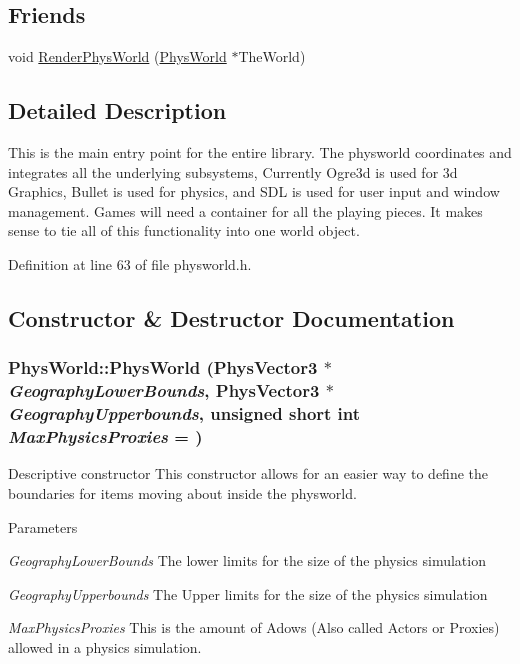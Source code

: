 \subsection*{Friends}
\begin{DoxyCompactItemize}
\item 
void \hyperlink{classPhysWorld_a54ca2a75bbccb9b2129f434874f1e693}{RenderPhysWorld} (\hyperlink{classPhysWorld}{PhysWorld} $\ast$TheWorld)
\end{DoxyCompactItemize}


\subsection{Detailed Description}
This is the main entry point for the entire library. The physworld coordinates and integrates all the underlying subsystems, Currently Ogre3d is used for 3d Graphics, Bullet is used for physics, and SDL is used for user input and window management. Games will need a container for all the playing pieces. It makes sense to tie all of this functionality into one world object. 

Definition at line 63 of file physworld.h.

\subsection{Constructor \& Destructor Documentation}
\hypertarget{classPhysWorld_a3228c98369082139722d3c918d735e6c}{
\subsubsection[{PhysWorld}]{\setlength{\rightskip}{0pt plus 5cm}PhysWorld::PhysWorld ({\bf PhysVector3} $\ast$ {\em GeographyLowerBounds}, \/  {\bf PhysVector3} $\ast$ {\em GeographyUpperbounds}, \/  unsigned short int {\em MaxPhysicsProxies} = {})}}
\label{db/df5/classPhysWorld_a3228c98369082139722d3c918d735e6c}


Descriptive constructor This constructor allows for an easier way to define the boundaries for items moving about inside the physworld. 
\begin{DoxyParams}{Parameters}
\item[{\em GeographyLowerBounds}]The lower limits for the size of the physics simulation \item[{\em GeographyUpperbounds}]The Upper limits for the size of the physics simulation \item[{\em MaxPhysicsProxies}]This is the amount of Adows (Also called Actors or Proxies) allowed in a physics simulation. \end{DoxyParams}



